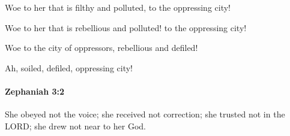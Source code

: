 			Woe to her that is filthy and polluted, to the oppressing city!

			\begin{versebox}
					\item[BHS] 
					\item[LXX] 
					\item[ASV] Woe to her that is rebellious and polluted! to the oppressing city!
					\item[NIV] Woe to the city of oppressors, rebellious and defiled!
					\item[NRSV] Ah, soiled, defiled, oppressing city!
			\end{versebox}

		\paragraph{Zephaniah 3:2} %
			\label{ZEPHANIAH-3-2}

			She obeyed not the voice; she received not correction; she trusted not in the LORD; she drew not near to her God.

